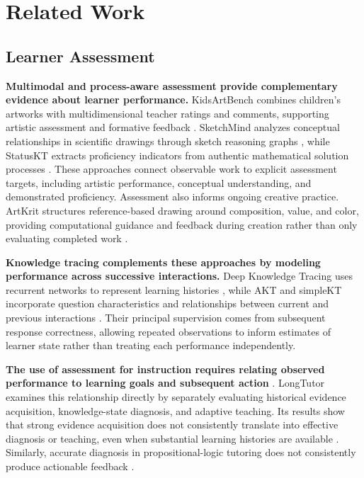 \section{Related Work}

\subsection{Learner Assessment}

\textbf{Multimodal and process-aware assessment provide complementary evidence about learner performance.} KidsArtBench combines children's artworks with multidimensional teacher ratings and comments, supporting artistic assessment and formative feedback \citep{ye2026multimodal}. SketchMind analyzes conceptual relationships in scientific drawings through sketch reasoning graphs \citep{latif2025sketchmind}, while StatusKT extracts proficiency indicators from authentic mathematical solution processes \citep{park2026statuskt}. These approaches connect observable work to explicit assessment targets, including artistic performance, conceptual understanding, and demonstrated proficiency. Assessment also informs ongoing creative practice. ArtKrit structures reference-based drawing around composition, value, and color, providing computational guidance and feedback during creation rather than only evaluating completed work \citep{ma2025artkrit}.

\textbf{Knowledge tracing complements these approaches by modeling performance across successive interactions.} Deep Knowledge Tracing uses recurrent networks to represent learning histories \citep{piech2015dkt}, while AKT and simpleKT incorporate question characteristics and relationships between current and previous interactions \citep{ghosh2020akt,liu2023simplekt}. Their principal supervision comes from subsequent response correctness, allowing repeated observations to inform estimates of learner state rather than treating each performance independently.

\textbf{The use of assessment for instruction requires relating observed performance to learning goals and subsequent action} \citep{hattie2007feedback,shute2008feedback}. LongTutor examines this relationship directly by separately evaluating historical evidence acquisition, knowledge-state diagnosis, and adaptive teaching. Its results show that strong evidence acquisition does not consistently translate into effective diagnosis or teaching, even when substantial learning histories are available \citep{li2026longtutor}. Similarly, accurate diagnosis in propositional-logic tutoring does not consistently produce actionable feedback \citep{yasir2026confirming}.


